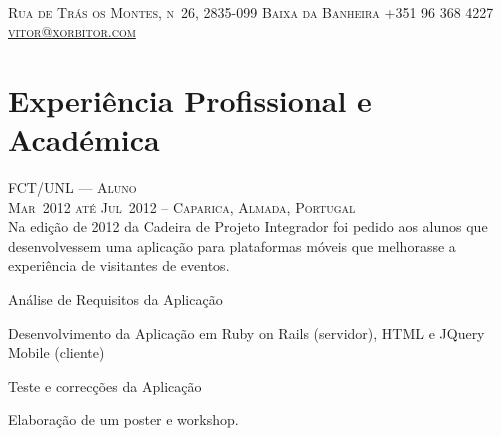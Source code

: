 \documentclass[a4paper,fontsize=10pt]{scrartcl} %
\begin{document}
\color{text1} %
\\
\textsc{\large{Rua de Trás os Montes, n\textordmasculine\ 26, 2835-099 Baixa da Banheira
{\tiny{\textcolor{bullets}{}}} +351 96 368 4227
{\tiny{\textcolor{bullets}{}}}
\href{mailto:vitor@xorbitor.com,vitor.o.matias@gmail.com}{vitor@xorbitor.com}}}\\

\color{text1}

\begin{minipage}[t]{0.5\textwidth} 
\vspace{0pt}	%

\section{Experiência Profissional e Académica}


\textsc{FCT/UNL --- Aluno}\\
\small\textsc{Mar~2012 até Jul~2012 -- Caparica, Almada, Portugal}\\ \normalsize
Na edição de 2012 da Cadeira de Projeto Integrador foi pedido aos alunos que desenvolvessem uma aplicação para plataformas móveis que melhorasse a experiência de visitantes de eventos.\\
\begin{inparaitem} 
	\item[] Análise de Requisitos da Aplicação
	\item Desenvolvimento da Aplicação em Ruby on Rails (servidor), HTML e JQuery Mobile (cliente)
	\item Teste e correcções da Aplicação
	\item Elaboração de um poster e workshop.
\end{inparaitem}
\\\par


\end{minipage}
\end{document}
